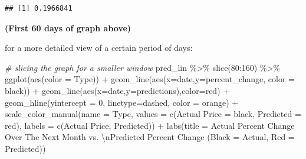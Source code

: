 \documentclass[
]{article}
\newenvironment{Shaded}{\begin{snugshade}}{\end{snugshade}}
\newcommand{\AttributeTok}[1]{\textcolor[rgb]{0.77,0.63,0.00}{#1}}
\newcommand{\CommentTok}[1]{\textcolor[rgb]{0.56,0.35,0.01}{\textit{#1}}}
\newcommand{\DecValTok}[1]{\textcolor[rgb]{0.00,0.00,0.81}{#1}}
\newcommand{\FunctionTok}[1]{\textcolor[rgb]{0.00,0.00,0.00}{#1}}
\newcommand{\NormalTok}[1]{#1}
\newcommand{\OtherTok}[1]{\textcolor[rgb]{0.56,0.35,0.01}{#1}}
\newcommand{\SpecialCharTok}[1]{\textcolor[rgb]{0.00,0.00,0.00}{#1}}
\newcommand{\StringTok}[1]{\textcolor[rgb]{0.31,0.60,0.02}{#1}}
\begin{document}
\begin{verbatim}
## [1] 0.1966841
\end{verbatim}

\textbf{(First 60 days of graph above)}

for a more detailed view of a certain period of days:

\begin{Shaded}
\begin{Highlighting}[]
\CommentTok{\# slicing the graph for a smaller window}
\NormalTok{pred\_lin }\SpecialCharTok{\%\textgreater{}\%} 
  \FunctionTok{slice}\NormalTok{(}\DecValTok{80}\SpecialCharTok{:}\DecValTok{160}\NormalTok{) }\SpecialCharTok{\%\textgreater{}\%}
  \FunctionTok{ggplot}\NormalTok{(}\FunctionTok{aes}\NormalTok{(}\AttributeTok{color =} \StringTok{\textquotesingle{}Type\textquotesingle{}}\NormalTok{)) }\SpecialCharTok{+}
  \FunctionTok{geom\_line}\NormalTok{(}\FunctionTok{aes}\NormalTok{(}\AttributeTok{x=}\NormalTok{date,}\AttributeTok{y=}\NormalTok{percent\_change, }\AttributeTok{color =} \StringTok{\textquotesingle{}black\textquotesingle{}}\NormalTok{)) }\SpecialCharTok{+}
  \FunctionTok{geom\_line}\NormalTok{(}\FunctionTok{aes}\NormalTok{(}\AttributeTok{x=}\NormalTok{date,}\AttributeTok{y=}\NormalTok{predictions),}\AttributeTok{color=}\StringTok{\textquotesingle{}red\textquotesingle{}}\NormalTok{) }\SpecialCharTok{+}
  \FunctionTok{geom\_hline}\NormalTok{(}\AttributeTok{yintercept =} \DecValTok{0}\NormalTok{, }\AttributeTok{linetype=}\StringTok{\textquotesingle{}dashed\textquotesingle{}}\NormalTok{, }\AttributeTok{color =} \StringTok{\textquotesingle{}orange\textquotesingle{}}\NormalTok{) }\SpecialCharTok{+} 
  \FunctionTok{scale\_color\_manual}\NormalTok{(}\AttributeTok{name =} \StringTok{\textquotesingle{}Type\textquotesingle{}}\NormalTok{, }
                     \AttributeTok{values =} \FunctionTok{c}\NormalTok{(}\StringTok{\textquotesingle{}Actual Price\textquotesingle{}} \OtherTok{=} \StringTok{\textquotesingle{}black\textquotesingle{}}\NormalTok{, }\StringTok{\textquotesingle{}Predicted\textquotesingle{}} \OtherTok{=} \StringTok{\textquotesingle{}red\textquotesingle{}}\NormalTok{),}
                     \AttributeTok{labels =} \FunctionTok{c}\NormalTok{(}\StringTok{\textquotesingle{}Actual Price\textquotesingle{}}\NormalTok{, }\StringTok{\textquotesingle{}Predicted\textquotesingle{}}\NormalTok{)) }\SpecialCharTok{+}
  \FunctionTok{labs}\NormalTok{(}\AttributeTok{title =} \StringTok{\textquotesingle{}Actual Percent Change Over The Next Month vs. }\SpecialCharTok{\textbackslash{}n}\StringTok{Predicted Percent Change (Black = Actual, Red = Predicted)\textquotesingle{}}\NormalTok{)}
\end{Highlighting}
\end{Shaded}
\end{document}
